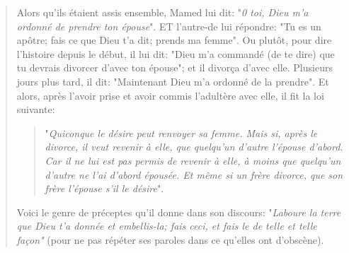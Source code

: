 \begin{quote}
Alors qu'ils étaient assis ensemble, Mamed lui dit: "\textit{0 toi, Dieu m'a ordonné de prendre ton épouse}". ET l'autre-de lui répondre: "Tu es un apôtre; fais ce que Dieu t'a dit; prends ma femme". Ou plutôt, pour dire l'histoire depuis le début, il lui dit: "Dieu m'a commandé (de te dire) que tu devrais divorcer d'avec ton épouse"; et il divorça d'avec elle. Plusieurs jours plus tard, il dit: "Maintenant Dieu m'a ordonné de la prendre". Et alors, après l'avoir prise et avoir commis l'adultère avec elle, il fit la loi suivante: \begin{quote}
    "\textit{Quiconque le désire peut renvoyer sa femme. Mais si, après le divorce, il veut revenir à elle, que quelqu'un d'autre l'épouse d'abord. Car il ne lui est pas permis de revenir à elle, à moins que quelqu'un d'autre ne l'ai d'abord épousée. Et même si un frère divorce, que son frère l'épouse s'il le désire}". 
\end{quote}
Voici le genre de préceptes qu'il donne dans son discours: "\textit{Laboure la terre que Dieu t'a donnée et embellis-la; fais ceci, et fais le de telle et telle façon"} (pour ne pas répéter ses paroles dans ce qu'elles ont d'obscène).


\end{quote}
